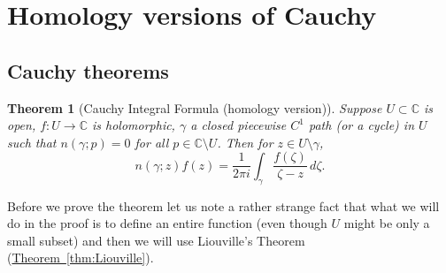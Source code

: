 \documentclass[12pt,openany]{book}
\newcommand{\C}{{\mathbb{C}}}
\theoremstyle{plain}
\newtheorem{thm}{Theorem}[section]
\theoremstyle{remark}
\theoremstyle{definition}
\theoremstyle{exercise}
\theoremstyle{example}
\newcommand{\thmref}[1]{\hyperref[#1]{Theorem~\ref*{#1}}}
\begin{document}

\section{Homology versions of Cauchy}

\subsection{Cauchy theorems}

\begin{thm}[Cauchy Integral Formula (homology version)]
\label{thm:CIFhomology}
Suppose $U \subset \C$ is open, $f \colon U \to \C$ is holomorphic,
$\gamma$ a closed piecewise $C^1$ path (or a cycle) in $U$
such that $n(\gamma;p) = 0$ for all $p \in \C \setminus U$.
Then for $z \in U \setminus \gamma$,
\begin{equation*}
n(\gamma;z)
f(z)
=
\frac{1}{2\pi i}
\int_{\gamma}
\frac{f(\zeta)}{\zeta-z}
\,
d \zeta .
\end{equation*}
\end{thm}

Before we prove the theorem let us note a
rather strange fact that what we will do in the proof is to define an entire
function (even though $U$ might be only a small subset) and then we will use
Liouville's Theorem (\thmref{thm:Liouville}).
\end{document}
